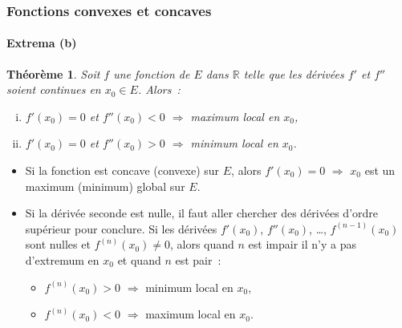 \documentclass[10pt,notheorems]{beamer}
\theoremstyle{plain}
\newtheorem{theorem}{Théorème}
\theoremstyle{definition} %
\begin{document}
\begin{frame}
  \frametitle{Fonctions convexes et concaves}
  \framesubtitle{Extrema (b)}
  \hypertarget{slide_fonctions_convexes_9}{}

  \begin{theorem}
    Soit $f$ une fonction de $E$ dans $\mathbb R$ telle que les dérivées $f'$ et $f''$ soient continues en $x_0\in E$. Alors~:
    \begin{enumerate}[(i)]
    \item $f'(x_0) = 0$ et $f''(x_0)<0$ $\Rightarrow$ maximum local en $x_0$,
    \item $f'(x_0) = 0$ et $f''(x_0)>0$ $\Rightarrow$ minimum local en $x_0$.
    \end{enumerate}
  \end{theorem}

  \bigskip

  \begin{itemize}

  \item Si la fonction est concave (convexe) sur $E$, alors
    $f'(x_0)=0$ $\Rightarrow$ $x_0$ est un maximum (minimum) global
    sur $E$.\newline

  \item Si la dérivée seconde est nulle, il faut aller chercher des
    dérivées d'ordre supérieur pour conclure. Si les dérivées
    $f'(x_0)$, $f''(x_0)$, \ldots, $f^{(n-1)}(x_0)$ sont nulles et
    $f^{(n)}(x_0)\neq 0$, alors quand $n$ est impair il n'y a pas
    d'extremum en $x_0$ et quand $n$ est pair~:

    \begin{itemize}
    \item $f^{(n)}(x_0)>0$ $\Rightarrow$ minimum local en $x_0$,
    \item $f^{(n)}(x_0)<0$ $\Rightarrow$ maximum local en $x_0$.
    \end{itemize}

  \end{itemize}
\end{frame}
\end{document}
